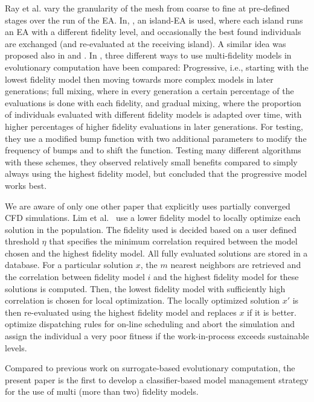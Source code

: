 Ray et al.\cite{RTT02} vary the granularity of the mesh from coarse to fine at pre-defined stages over the run of the EA.
In, \cite{EAPG98}, an island-EA is used, where each island runs an EA with a different fidelity level, and occasionally the best found individuals are exchanged (and re-evaluated at the receiving island). A similar idea was proposed also in \cite{SePe00} and \cite{KaGi08}.
In \cite{BeKe99}, three different ways to use multi-fidelity models in evolutionary computation have been compared: Progressive, i.e., starting with the lowest fidelity model then moving towards more complex models in later generations; full mixing, where in every generation a certain percentage of the evaluations is done with each fidelity, and gradual mixing, where the proportion of individuals evaluated with different fidelity models is adapted over time, with higher percentages of higher fidelity evaluations in later generations. For testing, they use a modified bump function with two additional parameters to modify the frequency of bumps and to shift the function. Testing many different algorithms with these schemes, they observed relatively small benefits compared to simply always using the highest fidelity model, but concluded that the progressive model works best.

We are aware of only one other paper that explicitly uses partially converged CFD simulations.
Lim et al.~\cite{Lim2008}  use a lower fidelity model to locally optimize each solution in the population. The fidelity used is decided based on a user defined threshold $\eta$ that specifies the minimum correlation required between the model chosen and the highest fidelity model. All fully evaluated solutions are stored in a database. For a particular solution $x$, the $m$ nearest neighbors are retrieved and the correlation between fidelity model $i$ and the highest fidelity model for these solutions is computed. Then, the lowest fidelity model with sufficiently high correlation is chosen for local optimization. The locally optimized solution $x'$ is then re-evaluated using the highest fidelity model and replaces $x$ if it is better. \cite{BraHil14} optimize dispatching rules for on-line scheduling and abort the simulation and assign the individual a very poor fitness if the work-in-process exceeds sustainable levels.

Compared to previous work on surrogate-based evolutionary computation, the present paper is the first to develop a classifier-based model management strategy for the use of multi (more than two) fidelity models.

